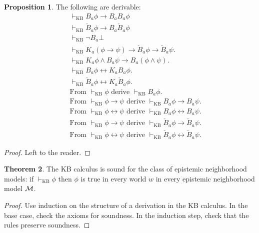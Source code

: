 \documentclass[12pt]{article}
\theoremstyle{definition}
\newtheorem{theorem}{Theorem}[section]
\newtheorem{proposition}[theorem]{Proposition}
\newcommand{\M}{{\cal M}}      %
\begin{document}
\begin{proposition} The following are derivable: 
\begin{eqnarray*}
 & & \vdash_{\text{KB}} B_a \phi \rightarrow B_a B_a \phi \\
 & & \vdash_{\text{KB}} \check{B}_a \phi \rightarrow B_a \check{B}_a \phi \\
            & & \vdash_{\text{KB}} \neg B_a \bot \\
            & & \vdash_{\text{KB}} K_a (\phi \rightarrow \psi) \rightarrow \check{B}_a \phi
                 \rightarrow \check{B}_a \psi. \\
            & & \vdash_{\text{KB}} K_a \phi \land B_a \psi \rightarrow B_a (\phi \land \psi). \\
            & & \vdash_{\text{KB}} B_a \phi \leftrightarrow K_a B_a \phi. \\
            & & \vdash_{\text{KB}} \check{B}_a \phi \leftrightarrow K_a \check{B}_a \phi. \\
  & & \text{From } \vdash_{\text{KB}} \phi 
        \text{ derive } \vdash_{\text{KB}} B_a \phi. \\
  & & \text{From } \vdash_{\text{KB}} \phi \rightarrow \psi 
        \text{ derive } \vdash_{\text{KB}} B_a \phi \rightarrow B_a \psi. \\
  & & \text{From } \vdash_{\text{KB}} \phi \leftrightarrow \psi 
        \text{ derive } \vdash_{\text{KB}} B_a \phi \leftrightarrow B_a \psi. \\
  & & \text{From } \vdash_{\text{KB}} \phi \rightarrow \psi 
        \text{ derive } \vdash_{\text{KB}} \check{B}_a \phi \rightarrow \check{B}_a \psi. \\
  & & \text{From } \vdash_{\text{KB}} \phi \leftrightarrow \psi 
        \text{ derive } \vdash_{\text{KB}} \check{B}_a \phi \leftrightarrow \check{B}_a \psi. 
\end{eqnarray*} 
\end{proposition} 
\begin{proof}
Left to the reader. 
\end{proof}

\begin{theorem} \label{SoundEMM}
The KB calculus is sound for the class of epistemic neighborhood models: 
if $\vdash_{\text{KB}} \phi$ then $\phi$ is true in every world $w$ in every epistemic neighborhood model $\M$. 
\end{theorem}
\begin{proof}
  Use induction on the structure of a derivation in the KB calculus. In
  the base case, check the axioms for soundness. In the induction
  step, check that the rules preserve soundness.
\end{proof}
\end{document}
